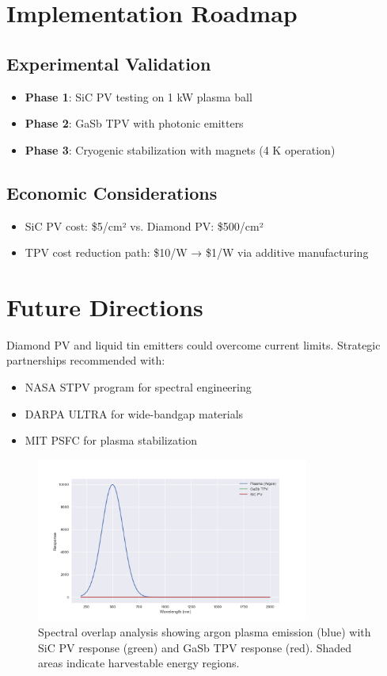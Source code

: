 \documentclass{article}
\begin{document}
\section{Implementation Roadmap}
\label{sec:roadmap}

\subsection{Experimental Validation}
\begin{itemize}
    \item \textbf{Phase 1}: SiC PV testing on 1 kW plasma ball
    \item \textbf{Phase 2}: GaSb TPV with photonic emitters
    \item \textbf{Phase 3}: Cryogenic stabilization with  magnets (4 K operation)
\end{itemize}

\subsection{Economic Considerations}
\begin{itemize}
    \item SiC PV cost: \$5/cm² vs. Diamond PV: \$500/cm²
    \item TPV cost reduction path: \$10/W → \$1/W via additive manufacturing
\end{itemize}

\section{Future Directions}
\label{sec:future}
Diamond PV and liquid tin emitters \citep{stanford2022} could overcome current limits. Strategic partnerships recommended with:
\begin{itemize}
    \item NASA STPV program \citep{nasa2023} for spectral engineering
    \item DARPA ULTRA for wide-bandgap materials
    \item MIT PSFC for plasma stabilization
\end{itemize}

\begin{figure}[ht]
  \centering
  \includegraphics[width=0.8\textwidth]{spectra.png}
  \caption{Spectral overlap analysis showing argon plasma emission (blue) with SiC PV response (green) and GaSb TPV response (red). Shaded areas indicate harvestable energy regions.}
  \label{fig:spectra}
\end{figure}
\end{document}
